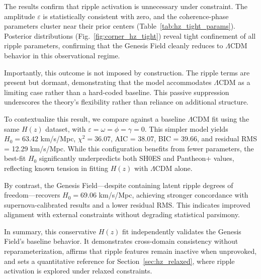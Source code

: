 The results confirm that ripple activation is unnecessary under constraint. The amplitude $\varepsilon$ is statistically consistent with zero, and the coherence-phase parameters cluster near their prior centers (Table~\ref{tab:hz_tight_params}). Posterior distributions (Fig.~\ref{fig:corner_hz_tight}) reveal tight confinement of all ripple parameters, confirming that the Genesis Field cleanly reduces to $\Lambda$CDM behavior in this observational regime.

Importantly, this outcome is not imposed by construction. The ripple terms are present but dormant, demonstrating that the model accommodates $\Lambda$CDM as a limiting case rather than a hard-coded baseline. This passive suppression underscores the theory’s flexibility rather than reliance on additional structure.

To contextualize this result, we compare against a baseline $\Lambda$CDM fit using the same $H(z)$ dataset, with $\varepsilon = \omega = \phi = \gamma = 0$. This simpler model yields $H_0 = 63.42$ km/s/Mpc, $\chi^2 = 36.07$, AIC = 38.07, BIC = 39.66, and residual RMS = 12.29 km/s/Mpc. While this configuration benefits from fewer parameters, the best-fit $H_0$ significantly underpredicts both SH0ES and Pantheon+ values, reflecting known tension in fitting $H(z)$ with $\Lambda$CDM alone.

By contrast, the Genesis Field—despite containing latent ripple degrees of freedom—recovers $H_0 = 69.06$ km/s/Mpc, achieving stronger concordance with supernova-calibrated results and a lower residual RMS. This indicates improved alignment with external constraints without degrading statistical parsimony.

In summary, this conservative $H(z)$ fit independently validates the Genesis Field’s baseline behavior. It demonstrates cross-domain consistency without reparameterization, affirms that ripple features remain inactive when unprovoked, and sets a quantitative reference for Section~\ref{sec:hz_relaxed}, where ripple activation is explored under relaxed constraints.

